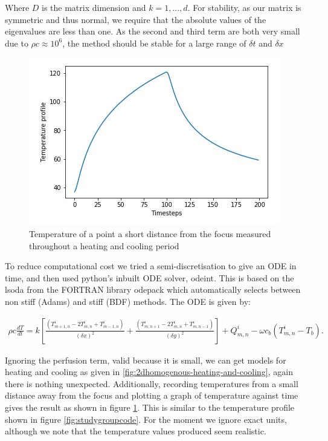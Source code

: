 \documentclass[11pt]{article} %
\begin{document}
Where $D$ is the matrix dimension and $k=1,...,d$. For stability, as our matrix is symmetric and thus normal, we require that the absolute values of the  eigenvalues are less than one. As the second and third term are both very small due to $\rho c \approx 10^6$, the method  should be stable for a large range of $ \delta t $ and $ \delta x $


\begin{figure}
	\centering
	\includegraphics[width=0.7\linewidth]{Report_images/study_group_code_2D_model}
	\caption{Temperature of a point a short distance from the focus measured throughout a heating and cooling period}
	\label{fig:studygroupcode2dmodel}
\end{figure}


To reduce computational cost we tried a semi-discretisation to give an ODE in time, and then used python's inbuilt ODE solver, odeint. This is based on the  lsoda from the FORTRAN library odepack which automatically selects between non stiff (Adams) and stiff (BDF) methods. The ODE is given by:

\begin{eqnarray}
\rho c \frac{dT}{dt}= k\left[  \frac{(T^i_{m+1,n}-2T^i_{m,n}+T^i_{m-1,n})}{(\delta x)^2}+\frac{(T^i_{m,n+1}-2T^i_{m,n}+T^i_{m,n-1})}{(\delta y)^2}\right] +Q^i_{m,n}-\omega c_b(T^i_{m,n}-T_b).
\end{eqnarray}

Ignoring the perfusion term, valid because it is small, we can get models for heating and cooling as given in \ref{fig:2dhomogenous-heating-and-cooling}, again there is nothing unexpected. Additionally, recording temperatures from a small distance away from the focus and plotting a graph of temperature against time gives the result as shown in figure \ref{fig:studygroupcode2dmodel}. This is similar to the temperature profile shown in figure \ref{fig:studygroupcode}. For the moment we ignore exact units, although we note that the temperature values produced seem realistic. 
\end{document}
